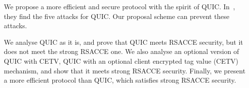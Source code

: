 We propose a more efficient and secure protocol with the spirit of QUIC. In~\cite{LJBN15:QUIC}, they find the five attacks for QUIC. Our proposal scheme can prevent these attacks.

%
We analyse QUIC as it is, and prove that QUIC meets RSACCE security, but it does not meet
the strong RSACCE one.
We also analyse an optional version of QUIC with CETV, QUIC with an optional client encrypted tag value
(CETV) mechanism, and show that it meets strong RSACCE security.
Finally, we present a more efficient protocol than QUIC, which satisfies strong RSACCE security.